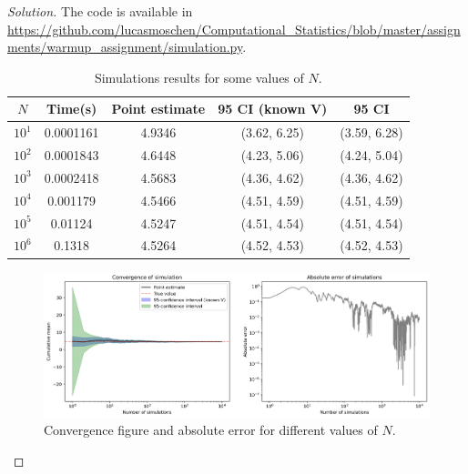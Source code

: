 \documentclass[a4paper,10pt, notitlepage]{report}
\begin{document}
\begin{enumerate}
\begin{proof}[Solution]
The code is available in \url{https://github.com/lucasmoschen/Computational_Statistics/blob/master/assignments/warmup_assignment/simulation.py}.

\begin{table}[ht]
    \centering
    \begin{tabular}{|c|c|c|c|c|}
    \hline
    \textbf{$N$} & \textbf{Time(s)} & \textbf{Point estimate} & \textbf{95 CI (known V)} & \textbf{95 CI} \\ \hline
    $10^1$          & 0.0001161             & 4.9346                  & (3.62, 6.25)             & (3.59, 6.28)               \\ \hline
    $10^2$          & 0.0001843             & 4.6448                  & (4.23, 5.06)             & (4.24, 5.04)               \\ \hline
    $10^3$         & 0.0002418             & 4.5683                  & (4.36, 4.62)             & (4.36, 4.62)               \\ \hline
    $10^4$        & 0.001179              & 4.5466                  & (4.51, 4.59)             & (4.51, 4.59)               \\ \hline
    $10^5$       & 0.01124               & 4.5247                  & (4.51, 4.54)             & (4.51, 4.54)               \\ \hline
    $10^6$      & 0.1318                & 4.5264                  & (4.52, 4.53)             & (4.52, 4.53)               \\ \hline
    \end{tabular}
\caption{Simulations results for some values of $N$.}
\label{tab:simulations}
\end{table}

\begin{figure}[ht]
    \centering
    \includegraphics[width=\textwidth]{figure_simulation.png}
    \caption{Convergence figure and absolute error for different values of $N$.}
    \label{fig:simulations}
\end{figure}


\end{proof}
\end{enumerate}
\end{document}
